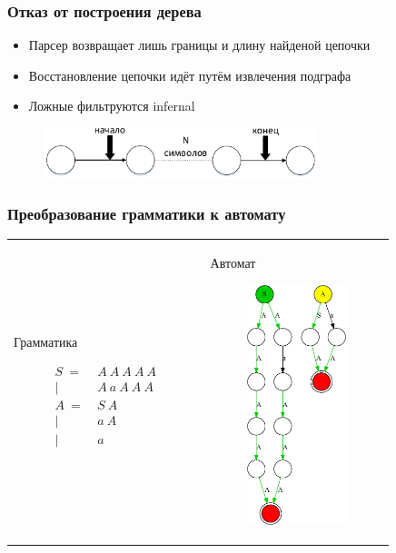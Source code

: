\documentclass{beamer}
\begin{document}
    \begin{frame}
        \frametitle{Отказ от построения дерева}
        \begin{itemize}
            \item Парсер возвращает лишь границы и длину найденой цепочки
            \item Восстановление цепочки идёт путём извлечения подграфа
            \item Ложные фильтруются infernal
        \end{itemize}
        
        \begin{figure}[b]
            \centering
            \includegraphics[width=8cm]{pictures/noTree.pdf}  
        \end{figure}
    \end{frame}

    \begin{frame}
        \frametitle{Преобразование грамматики к автомату}
        \begin{tabular}{p{5cm} p{4cm}}
            Грамматика
            \begin{figure}[t]
                {$\!\begin{aligned}
                    S\ =&\ A\ A\ A\ A\ A \\
                       |&\ A\ a\ A\ A\ A \\
                    A\ =&\ S\ A \\
                       |&\ a\ A \\
                       |&\ a
                    \end{aligned}$}
            \end{figure}
            &
            Автомат
            \begin{figure}[t]
                \centering
                \includegraphics[height=7cm]{pictures/initialNFA.pdf}
            \end{figure}
        \end{tabular}
    \end{frame}
\end{document}
